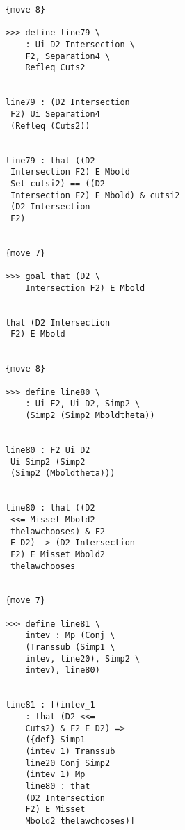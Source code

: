 \documentclass[12pt]{article}
\begin{document}
\begin{verbatim}
                        {move 8}

                        >>> define line79 \
                            : Ui D2 Intersection \
                            F2, Separation4 \
                            Refleq Cuts2


                        line79 : (D2 Intersection 
                         F2) Ui Separation4 
                         (Refleq (Cuts2))


                        line79 : that ((D2 
                         Intersection F2) E Mbold 
                         Set cutsi2) == ((D2 
                         Intersection F2) E Mbold) & cutsi2 
                         (D2 Intersection 
                         F2)


                        {move 7}

                        >>> goal that (D2 \
                            Intersection F2) E Mbold


                        that (D2 Intersection 
                         F2) E Mbold


                        {move 8}

                        >>> define line80 \
                            : Ui F2, Ui D2, Simp2 \
                            (Simp2 (Simp2 Mboldtheta))


                        line80 : F2 Ui D2 
                         Ui Simp2 (Simp2 
                         (Simp2 (Mboldtheta)))


                        line80 : that ((D2 
                         <<= Misset Mbold2 
                         thelawchooses) & F2 
                         E D2) -> (D2 Intersection 
                         F2) E Misset Mbold2 
                         thelawchooses


                        {move 7}

                        >>> define line81 \
                            intev : Mp (Conj \
                            (Transsub (Simp1 \
                            intev, line20), Simp2 \
                            intev), line80)


                        line81 : [(intev_1 
                            : that (D2 <<= 
                            Cuts2) & F2 E D2) => 
                            ({def} Simp1 
                            (intev_1) Transsub 
                            line20 Conj Simp2 
                            (intev_1) Mp 
                            line80 : that 
                            (D2 Intersection 
                            F2) E Misset 
                            Mbold2 thelawchooses)]



\end{verbatim}
\end{document}
